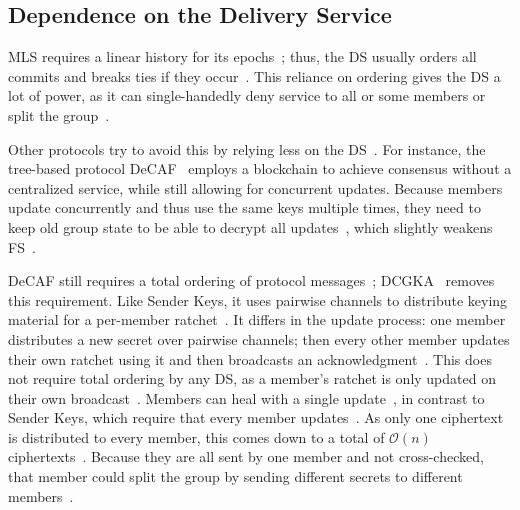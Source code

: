 \documentclass[conference]{IEEEtran}
\begin{document}
\subsection{Dependence on the Delivery Service}\label{sec:ds-dependence}
\ac{MLS} requires a linear history for its epochs~\cite{beurdoucheMessagingLayerSecurity2025}; thus, the \ac{DS} usually orders all commits and breaks ties if they occur~\cite{beurdoucheMessagingLayerSecurity2025,weidnerKeyAgreementDecentralized2021}.
This reliance on ordering gives the \ac{DS} a lot of power, as it can single-handedly deny service to all or some members or split the group~\cite{beurdoucheMessagingLayerSecurity2025,alwenDeCAFDecentralizableCGKA2024}.

Other protocols try to avoid this by relying less on the \ac{DS}~\cite{alwenDeCAFDecentralizableCGKA2024,weidnerKeyAgreementDecentralized2021}.
For instance, the tree-based protocol DeCAF~\cite{alwenDeCAFDecentralizableCGKA2024} employs a blockchain to achieve consensus without a centralized service, while still allowing for concurrent updates.
Because members update concurrently and thus use the same keys multiple times, they need to keep old group state to be able to decrypt all updates~\cite{alwenDeCAFDecentralizableCGKA2024}, which slightly weakens \ac{FS}~\cite{alwenDeCAFDecentralizableCGKA2024}.

DeCAF still requires a total ordering of protocol messages~\cite{alwenDeCAFDecentralizableCGKA2024}; DCGKA~\cite{weidnerKeyAgreementDecentralized2021} removes this requirement.
Like Sender Keys, it uses pairwise channels to distribute keying material for a per-member ratchet~\cite{weidnerKeyAgreementDecentralized2021}.
It differs in the update process: one member distributes a new secret over pairwise channels; then every other member updates their own ratchet using it and then broadcasts an acknowledgment~\cite{weidnerKeyAgreementDecentralized2021}.
This does not require total ordering by any \ac{DS}, as a member's ratchet is only updated on their own broadcast~\cite{weidnerKeyAgreementDecentralized2021}.
Members can heal with a single update~\cite{weidnerKeyAgreementDecentralized2021}, in contrast to Sender Keys, which require that every member updates~\cite{balbasWhatsUppSenderKeys2023,weidnerKeyAgreementDecentralized2021}.
As only one ciphertext is distributed to every member, this comes down to a total of $\mathcal{O}(n)$ ciphertexts~\cite{weidnerKeyAgreementDecentralized2021}.
Because they are all sent by one member and not cross-checked, that member could split the group by sending different secrets to different members~\cite{weidnerKeyAgreementDecentralized2021}.
\end{document}
